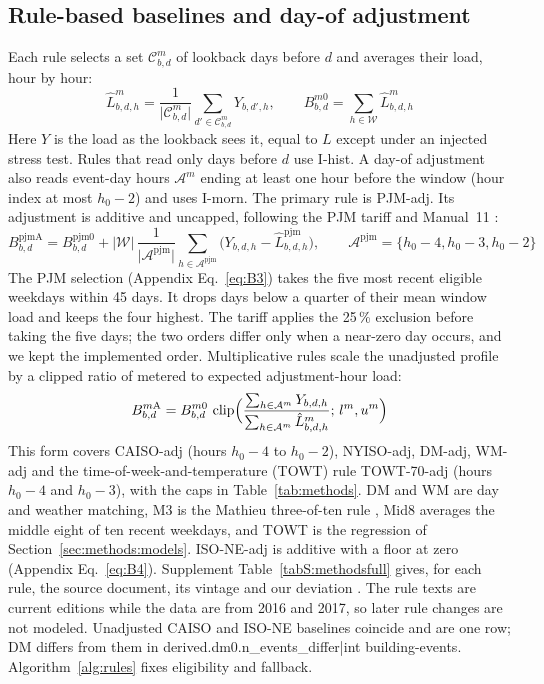 \subsection{Rule-based baselines and day-of adjustment}\label{sec:methods:rules}

Each rule selects a set $\mathcal{C}^{m}_{b,d}$ of lookback days before $d$ and averages their load, hour by hour:
\begin{equation}\label{eq:profile}
\hat{L}^{m}_{b,d,h}=\frac{1}{\lvert\mathcal{C}^{m}_{b,d}\rvert}\sum_{d'\in\mathcal{C}^{m}_{b,d}}Y_{b,d',h},\qquad B^{m0}_{b,d}=\sum_{h\in\mathcal{W}}\hat{L}^{m}_{b,d,h}
\end{equation}
Here $Y$ is the load as the lookback sees it, equal to $L$ except under an injected stress test. Rules that read only days before $d$ use I-hist. A day-of adjustment also reads event-day hours $\mathcal{A}^{m}$ ending at least one hour before the window (hour index at most $h_0-2$) and uses I-morn. The primary rule is PJM-adj. Its adjustment is additive and uncapped, following the PJM tariff and Manual~11 \cite{pjm_attk,pjm_manual11}:
\begin{equation}\label{eq:pjma}
B^{\mathrm{pjmA}}_{b,d}=B^{\mathrm{pjm0}}_{b,d}+\lvert\mathcal{W}\rvert\,\frac{1}{\lvert\mathcal{A}^{\mathrm{pjm}}\rvert}\sum_{h\in\mathcal{A}^{\mathrm{pjm}}}\bigl(Y_{b,d,h}-\hat{L}^{\mathrm{pjm}}_{b,d,h}\bigr),\qquad \mathcal{A}^{\mathrm{pjm}}=\{h_0-4,h_0-3,h_0-2\}
\end{equation}
The PJM selection (Appendix Eq.~\eqref{eq:B3}) takes the five most recent eligible weekdays within 45 days. It drops days below a quarter of their mean window load and keeps the four highest. The tariff applies the 25\,\% exclusion before taking the five days; the two orders differ only when a near-zero day occurs, and we kept the implemented order. Multiplicative rules scale the unadjusted profile by a clipped ratio of metered to expected adjustment-hour load:
\begin{equation}\label{eq:ratio}
B^{m\mathrm{A}}_{b,d}=B^{m0}_{b,d}\,\operatorname{clip}\Bigl(\frac{\sum_{h\in\mathcal{A}^{m}}Y_{b,d,h}}{\sum_{h\in\mathcal{A}^{m}}\hat{L}^{m}_{b,d,h}};\,l^{m},u^{m}\Bigr)
\end{equation}
This form covers CAISO-adj (hours $h_0-4$ to $h_0-2$), NYISO-adj, DM-adj, WM-adj and the time-of-week-and-temperature (TOWT) rule TOWT-70-adj (hours $h_0-4$ and $h_0-3$), with the caps in Table~\ref{tab:methods}. DM and WM are day and weather matching, M3 is the Mathieu three-of-ten rule \cite{mathieu2011}, Mid8 averages the middle eight of ten recent weekdays, and TOWT is the regression of Section~\ref{sec:methods:models}. ISO-NE-adj is additive with a floor at zero (Appendix Eq.~\eqref{eq:B4}). Supplement Table~\ref{tabS:methodsfull} gives, for each rule, the source document, its vintage and our deviation \cite{caiso_tariff,nyiso_manual7,isone_mr1,granderson2021,mathieu2011}. The rule texts are current editions while the data are from 2016 and 2017, so later rule changes are not modeled. Unadjusted CAISO and ISO-NE baselines coincide and are one row; DM differs from them in {{derived.dm0.n_events_differ|int}} building-events. Algorithm~\ref{alg:rules} fixes eligibility and fallback.

